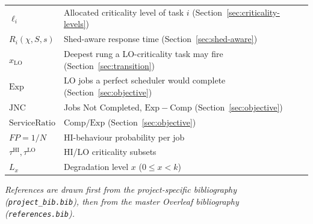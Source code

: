 \begin{table}[h]
\begin{tabular}{ll}
$\ell_i$ & Allocated criticality level of task $i$ (Section~\ref{sec:criticality-levels}) \\
$R_i(\chi, S, s)$ & Shed-aware response time (Section~\ref{sec:shed-aware}) \\
$x_{\mathrm{LO}}$ & Deepest rung a LO-criticality task may fire (Section~\ref{sec:transition}) \\
$\mathrm{Exp}$ & LO jobs a perfect scheduler would complete (Section~\ref{sec:objective}) \\
$\mathrm{JNC}$ & Jobs Not Completed, $\mathrm{Exp} - \mathrm{Comp}$ (Section~\ref{sec:objective}) \\
$\mathrm{ServiceRatio}$ & $\mathrm{Comp}/\mathrm{Exp}$ (Section~\ref{sec:objective}) \\
$FP = 1/N$ & HI-behaviour probability per job \\
$\tau^{\mathrm{HI}}, \tau^{\mathrm{LO}}$ & HI/LO criticality subsets \\
$L_x$ & Degradation level $x$ ($0 \leq x < k$) \\
\bottomrule
\end{tabular}
\end{table}

\bigskip
\noindent\textit{References are drawn first from the project-specific bibliography
(\texttt{project\_bib.bib}), then from the master Overleaf bibliography
(\texttt{references.bib}).}
